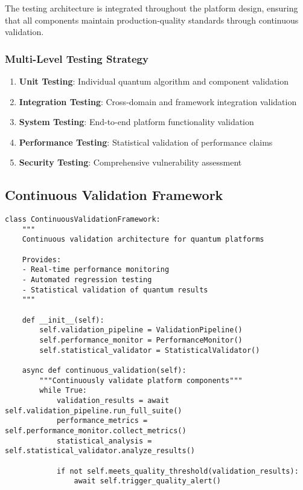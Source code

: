 \documentclass[12pt,a4paper]{report}
\begin{document}
The testing architecture is integrated throughout the platform design, ensuring that all components maintain production-quality standards through continuous validation.

\subsubsection{Multi-Level Testing Strategy}

\begin{enumerate}
\item \textbf{Unit Testing}: Individual quantum algorithm and component validation
\item \textbf{Integration Testing}: Cross-domain and framework integration validation
\item \textbf{System Testing}: End-to-end platform functionality validation
\item \textbf{Performance Testing}: Statistical validation of performance claims
\item \textbf{Security Testing}: Comprehensive vulnerability assessment
\end{enumerate}

\subsection{Continuous Validation Framework}

\begin{lstlisting}
class ContinuousValidationFramework:
    """
    Continuous validation architecture for quantum platforms

    Provides:
    - Real-time performance monitoring
    - Automated regression testing
    - Statistical validation of quantum results
    """

    def __init__(self):
        self.validation_pipeline = ValidationPipeline()
        self.performance_monitor = PerformanceMonitor()
        self.statistical_validator = StatisticalValidator()

    async def continuous_validation(self):
        """Continuously validate platform components"""
        while True:
            validation_results = await self.validation_pipeline.run_full_suite()
            performance_metrics = self.performance_monitor.collect_metrics()
            statistical_analysis = self.statistical_validator.analyze_results()

            if not self.meets_quality_threshold(validation_results):
                await self.trigger_quality_alert()
\end{lstlisting}
\end{document}
